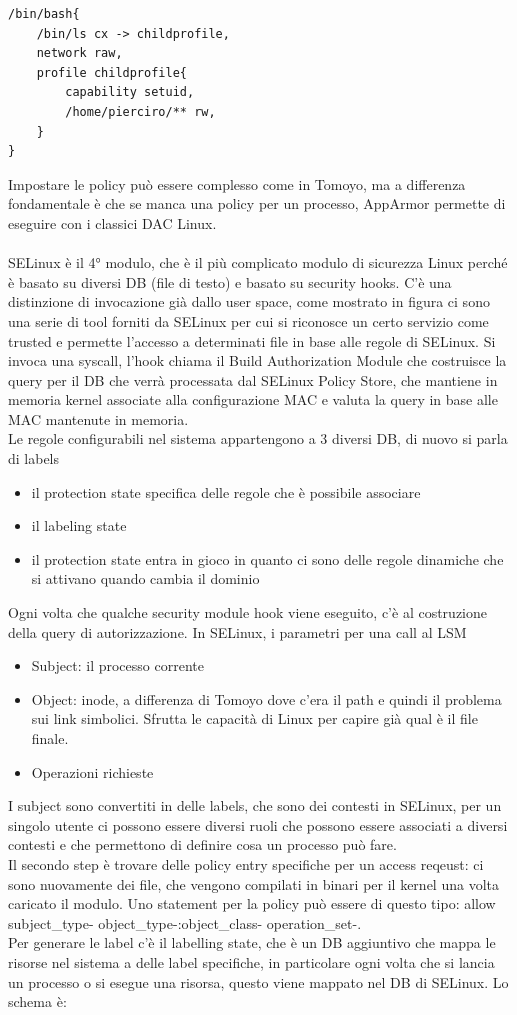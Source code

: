 \documentclass[12pt, oneside]{extbook} %
\begin{document}
\begin{lstlisting}
/bin/bash{
	/bin/ls cx -> childprofile,
	network raw,
	profile childprofile{
		capability setuid,
		/home/pierciro/** rw,	
	}
}
\end{lstlisting}
Impostare le policy può essere complesso come in Tomoyo, ma a differenza fondamentale è che se manca una policy per un processo, AppArmor permette di eseguire con i classici DAC Linux.\\\\SELinux è il 4° modulo, che è il più complicato modulo di sicurezza Linux perché è basato su diversi DB (file di testo) e basato su security hooks. C'è una distinzione di invocazione già dallo user space, come mostrato in figura
ci sono una serie di tool forniti da SELinux per cui si riconosce un certo servizio come trusted e permette l'accesso a determinati file in base alle regole di SELinux. Si invoca una syscall, l'hook chiama il Build Authorization Module che costruisce la query per il DB che verrà processata dal SELinux Policy Store, che mantiene in memoria kernel associate alla configurazione MAC e valuta la query in base alle MAC mantenute in memoria.\\Le regole configurabili nel sistema appartengono a 3 diversi DB, di nuovo si parla di labels
\begin{itemize}
\item il protection state specifica delle regole che  è possibile associare
\item il labeling state
\item il protection state entra in gioco in quanto ci sono delle regole dinamiche che si attivano quando cambia il dominio
\end{itemize}
Ogni volta che qualche security module hook viene eseguito, c'è al costruzione della query di autorizzazione. In SELinux, i parametri per una call al LSM
\begin{itemize}
\item Subject: il processo corrente
\item Object: inode, a differenza di Tomoyo dove c'era il path e quindi il problema sui link simbolici. Sfrutta le capacità di Linux per capire già qual è il file finale.
\item Operazioni richieste
\end{itemize}
I subject sono convertiti in delle labels, che sono dei contesti in SELinux, per un singolo utente ci possono essere diversi ruoli che possono essere associati a diversi contesti e che permettono di definire cosa un processo può fare.\\Il secondo step è trovare delle policy entry specifiche per un access reqeust: ci sono nuovamente dei file, che vengono compilati in binari per il kernel una volta caricato il modulo. Uno statement per la policy può essere di questo tipo: allow \-subject\_type- \-object\_type-:\-object\_class- \-operation\_set-.\\Per generare le label c'è il labelling state, che è un DB aggiuntivo che mappa le risorse nel sistema a delle label specifiche, in particolare ogni volta che si lancia un processo o si esegue una risorsa, questo viene mappato nel DB di SELinux. Lo schema è:
\end{document}
